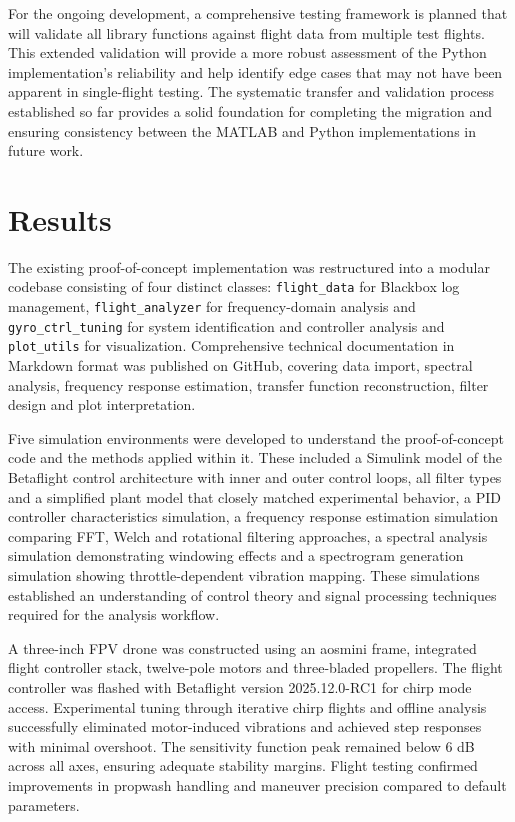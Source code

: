 \documentclass[a4paper,11pt]{scrartcl}
\begin{document}
For the ongoing development, a comprehensive testing framework is planned that will validate all library functions against flight data from multiple test flights.
This extended validation will provide a more robust assessment of the Python implementation's reliability and help identify edge cases that may not have been apparent in single-flight testing.
The systematic transfer and validation process established so far provides a solid foundation for completing the migration and ensuring consistency between the MATLAB and Python implementations in future work.

\clearpage

\section{Results}
\label{sec:Results}

The existing proof-of-concept implementation was restructured into a modular codebase consisting of four distinct classes: \texttt{flight\_data} for Blackbox log management, \texttt{flight\_analyzer} for frequency-domain analysis and \texttt{gyro\_ctrl\_tuning} for system identification and controller analysis and \texttt{plot\_utils} for visualization. Comprehensive technical documentation in Markdown format was published on GitHub, covering data import, spectral analysis, frequency response estimation, transfer function reconstruction, filter design and plot interpretation.

Five simulation environments were developed to understand the proof-of-concept code and the methods applied within it. These included a Simulink model of the Betaflight control architecture with inner and outer control loops, all filter types and a simplified plant model that closely matched experimental behavior, a PID controller characteristics simulation, a frequency response estimation simulation comparing FFT, Welch and rotational filtering approaches, a spectral analysis simulation demonstrating windowing effects and a spectrogram generation simulation showing throttle-dependent vibration mapping. These simulations established an understanding of control theory and signal processing techniques required for the analysis workflow.

A three-inch FPV drone was constructed using an aosmini frame, integrated flight controller stack, twelve-pole motors and three-bladed propellers. The flight controller was flashed with Betaflight version 2025.12.0-RC1 for chirp mode access. Experimental tuning through iterative chirp flights and offline analysis successfully eliminated motor-induced vibrations and achieved step responses with minimal overshoot. The sensitivity function peak remained below 6 dB across all axes, ensuring adequate stability margins. Flight testing confirmed improvements in propwash handling and maneuver precision compared to default parameters.
\end{document}
